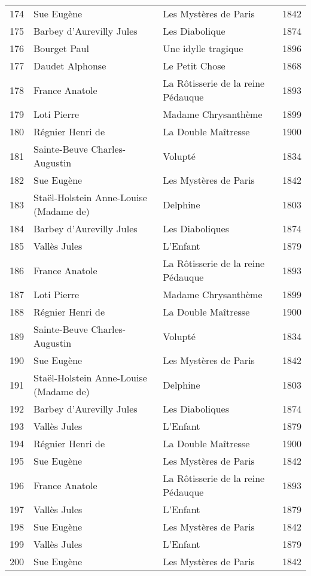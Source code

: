 \begin{table}
\begin{tabular}{l l l l}
    174 & Sue Eugène & Les Mystères de Paris & 1842 \\
    175 & Barbey d'Aurevilly Jules & Les Diabolique & 1874 \\
    176 & Bourget Paul & Une idylle tragique & 1896 \\
    177 & Daudet Alphonse & Le Petit Chose & 1868 \\
    178 & France Anatole & La Rôtisserie de la reine Pédauque & 1893 \\
    179 & Loti Pierre & Madame Chrysanthème & 1899 \\
    180 & Régnier Henri de & La Double Maîtresse & 1900 \\
    181 & Sainte-Beuve Charles-Augustin & Volupté & 1834 \\
    182 & Sue Eugène & Les Mystères de Paris & 1842 \\
    183 & Staël-Holstein Anne-Louise (Madame de) & Delphine & 1803 \\
    184 & Barbey d'Aurevilly Jules & Les Diaboliques & 1874 \\
    185 & Vallès Jules & L'Enfant & 1879 \\
    186 & France Anatole & La Rôtisserie de la reine Pédauque & 1893 \\
    187 & Loti Pierre & Madame Chrysanthème & 1899 \\
    188 & Régnier Henri de & La Double Maîtresse & 1900 \\
    189 & Sainte-Beuve Charles-Augustin & Volupté & 1834 \\
    190 & Sue Eugène & Les Mystères de Paris & 1842 \\
    191 & Staël-Holstein Anne-Louise (Madame de) & Delphine & 1803 \\
    192 & Barbey d'Aurevilly Jules & Les Diaboliques & 1874 \\
    193 & Vallès Jules & L'Enfant & 1879 \\
    194 & Régnier Henri de & La Double Maîtresse & 1900 \\
    195 & Sue Eugène & Les Mystères de Paris & 1842 \\
    196 & France Anatole & La Rôtisserie de la reine Pédauque & 1893 \\
    197 & Vallès Jules & L'Enfant & 1879 \\
    198 & Sue Eugène & Les Mystères de Paris & 1842 \\
    199 & Vallès Jules & L'Enfant & 1879 \\
    200 & Sue Eugène & Les Mystères de Paris & 1842 \\
    \bottomrule
  \end{tabular}
\end{table}
